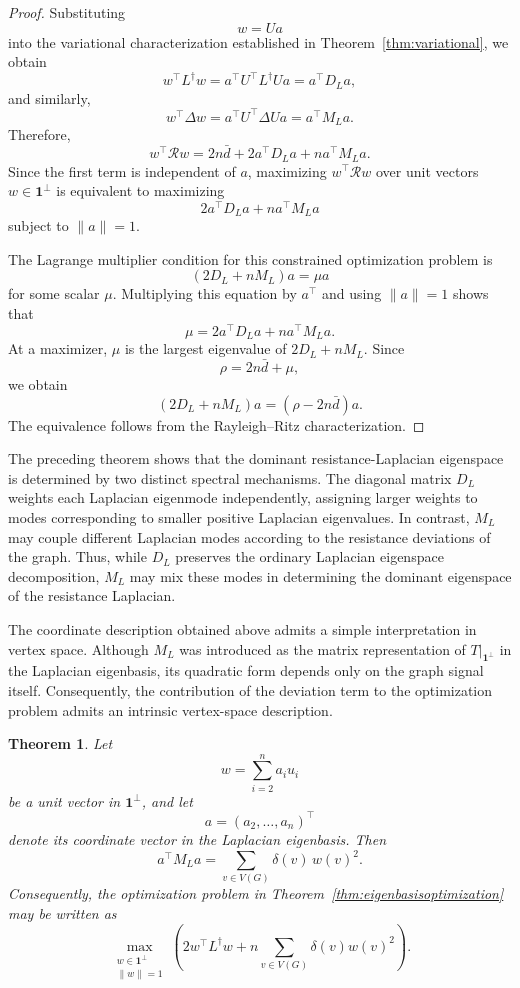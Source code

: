 \documentclass[12pt,a4paper]{amsart}
\newtheorem{theorem}{Theorem}[section]
\theoremstyle{remark}
\theoremstyle{definition}
\newcommand{\Rs}{\mathcal{R}}
\newcommand{\1}{\mathbf{1}}
\newcommand{\0}{\mathbf{0}}
\begin{document}
\begin{proof}
Substituting
\[
w=Ua
\]
into the variational characterization established in
Theorem~\ref{thm:variational}, we obtain
\[
w^\top L^\dagger w
=
a^\top U^\top L^\dagger Ua
=
a^\top D_La,
\]
and similarly,
\[
w^\top\Delta w
=
a^\top U^\top\Delta Ua
=
a^\top M_La.
\]
Therefore,
\[
w^\top\Rs w
=
2n\bar d
+
2a^\top D_La
+
na^\top M_La.
\]
Since the first term is independent of $a$, maximizing
$w^\top\Rs w$ over unit vectors $w\in\mathbf{1}^{\perp}$ is
equivalent to maximizing
\[
2a^\top D_La+na^\top M_La
\]
subject to $\|a\|=1$.

The Lagrange multiplier condition for this constrained optimization
problem is
\[
(2D_L+nM_L)a=\mu a
\]
for some scalar $\mu$. Multiplying this equation by $a^\top$ and using
$\|a\|=1$ shows that
\[
\mu
=
2a^\top D_La
+
na^\top M_La.
\]
At a maximizer, $\mu$ is the largest eigenvalue of
$2D_L+nM_L$. Since
\[
\rho=2n\bar d+\mu,
\]
we obtain
\[
(2D_L+nM_L)a
=
(\rho-2n\bar d)a.
\]
The equivalence follows from the Rayleigh--Ritz characterization.
\end{proof}





The preceding theorem shows that the dominant resistance-Laplacian
eigenspace is determined by two distinct spectral mechanisms. The
diagonal matrix $D_L$ weights each Laplacian eigenmode independently,
assigning larger weights to modes corresponding to smaller positive
Laplacian eigenvalues. In contrast, $M_L$ may couple different
Laplacian modes according to the resistance deviations of the graph.
Thus, while $D_L$ preserves the ordinary Laplacian eigenspace
decomposition, $M_L$ may mix these modes in determining the dominant
eigenspace of the resistance Laplacian.

The coordinate description obtained above admits a simple
interpretation in vertex space. Although $M_L$ was introduced as the
matrix representation of
$\left.T\right|_{\mathbf{1}^{\perp}}$ in the Laplacian eigenbasis, its
quadratic form depends only on the graph signal itself. Consequently,
the contribution of the deviation term to the optimization problem
admits an intrinsic vertex-space description.

\begin{theorem}\label{thm:vertexenergy}
Let
\[
w=\sum_{i=2}^{n}a_i u_i
\]
be a unit vector in $\mathbf{1}^{\perp}$, and let
\[
a=(a_2,\ldots,a_n)^\top
\]
denote its coordinate vector in the Laplacian eigenbasis. Then
\[
a^\top M_La
=
\sum_{v\in V(G)}
\delta(v)\,w(v)^2.
\]
Consequently, the optimization problem in
Theorem~\ref{thm:eigenbasisoptimization} may be written as
\[
\max_{\substack{w\in\mathbf{1}^{\perp}\\\|w\|=1}}
\left(
2w^\top L^\dagger w
+
n\sum_{v\in V(G)}
\delta(v)w(v)^2
\right).
\]
\end{theorem}
\end{document}
